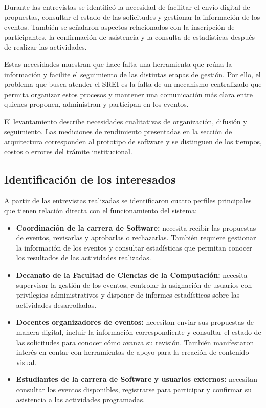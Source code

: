 Durante las entrevistas se identificó la necesidad de facilitar el envío digital de propuestas, consultar el estado de las solicitudes y gestionar la información de los eventos. También se señalaron aspectos relacionados con la inscripción de participantes, la confirmación de asistencia y la consulta de estadísticas después de realizar las actividades.

Estas necesidades muestran que hace falta una herramienta que reúna la información y facilite el seguimiento de las distintas etapas de gestión. Por ello, el problema que busca atender el SREI es la falta de un mecanismo centralizado que permita organizar estos procesos y mantener una comunicación más clara entre quienes proponen, administran y participan en los eventos.

El levantamiento describe necesidades cualitativas de organización, difusión y seguimiento. Las mediciones de rendimiento presentadas en la sección de arquitectura corresponden al prototipo de software y se distinguen de los tiempos, costos o errores del trámite institucional.

\subsection{Identificación de los interesados}

A partir de las entrevistas realizadas se identificaron cuatro perfiles principales que tienen relación directa con el funcionamiento del sistema:

\begin{itemize}

    \item \textbf{Coordinación de la carrera de Software:} necesita recibir las propuestas de eventos, revisarlas y aprobarlas o rechazarlas. También requiere gestionar la información de los eventos y consultar estadísticas que permitan conocer los resultados de las actividades realizadas.

    \item \textbf{Decanato de la Facultad de Ciencias de la Computación:} necesita supervisar la gestión de los eventos, controlar la asignación de usuarios con privilegios administrativos y disponer de informes estadísticos sobre las actividades desarrolladas.

    \item \textbf{Docentes organizadores de eventos:} necesitan enviar sus propuestas de manera digital, incluir la información correspondiente y consultar el estado de las solicitudes para conocer cómo avanza su revisión. También manifestaron interés en contar con herramientas de apoyo para la creación de contenido visual.

    \item \textbf{Estudiantes de la carrera de Software y usuarios externos:} necesitan consultar los eventos disponibles, registrarse para participar y confirmar su asistencia a las actividades programadas.

\end{itemize}



